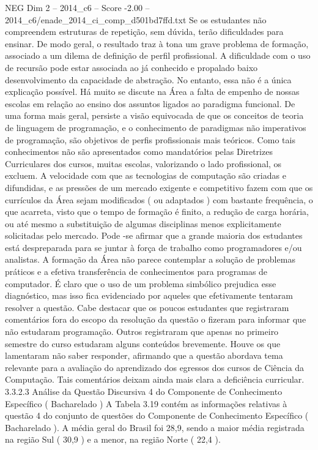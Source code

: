 \begin{textsample}{NEG Dim 2 – 2014\_c6 – Score -2.00 – 2014\_c6/enade\_2014\_ci\_comp\_d501bd7ffd.txt}
Se os estudantes não compreendem estruturas de repetição, sem dúvida, terão dificuldades para ensinar.
De modo geral, o resultado traz à tona um grave problema de formação, associado a um dilema de definição de perfil profissional.
A dificuldade com o uso de recursão pode estar associada ao já conhecido e propalado baixo desenvolvimento da capacidade de abstração.
No entanto, essa não é a única explicação possível.
Há muito se discute na Área a falta de empenho de nossas escolas em relação ao ensino dos assuntos ligados ao paradigma funcional.
De uma forma mais geral, persiste a visão equivocada de que os conceitos de teoria de linguagem de programação, e o conhecimento de paradigmas não imperativos de programação, são objetivos de perfis profissionais mais teóricos.
Como tais conhecimentos não são apresentados como mandatórios pelas Diretrizes Curriculares dos cursos, muitas escolas, valorizando o lado profissional, os excluem.
A velocidade com que as tecnologias de computação são criadas e difundidas, e as pressões de um mercado exigente e competitivo fazem com que os currículos da Área sejam modificados ( ou adaptados ) com bastante frequência, o que acarreta, visto que o tempo de formação é finito, a redução de carga horária, ou até mesmo a substituição de algumas disciplinas menos explicitamente solicitadas pelo mercado.
Pode -se afirmar que a grande maioria dos estudantes está despreparada para se juntar à força de trabalho como programadores e/ou analistas.
A formação da Área não parece contemplar a solução de problemas práticos e a efetiva transferência de conhecimentos para programas de computador.
É claro que o uso de um problema simbólico prejudica esse diagnóstico, mas isso fica evidenciado por aqueles que efetivamente tentaram resolver a questão.
Cabe destacar que os poucos estudantes que registraram comentários fora do escopo da resolução da questão o fizeram para informar que não estudaram programação.
Outros registraram que apenas no primeiro semestre do curso estudaram alguns conteúdos brevemente.
Houve os que lamentaram não saber responder, afirmando que a questão abordava tema relevante para a avaliação do aprendizado dos egressos dos cursos de Ciência da Computação.
Tais comentários deixam ainda mais clara a deficiência curricular. 3.3.2.3 Análise da Questão Discursiva 4 do Componente de Conhecimento Específico ( Bacharelado ) A Tabela 3.19 contém as informações relativas à questão 4 do conjunto de questões do Componente de Conhecimento Específico ( Bacharelado ).
A média geral do Brasil foi 28,9, sendo a maior média registrada na região Sul ( 30,9 ) e a menor, na região Norte ( 22,4 ).

\end{textsample}
